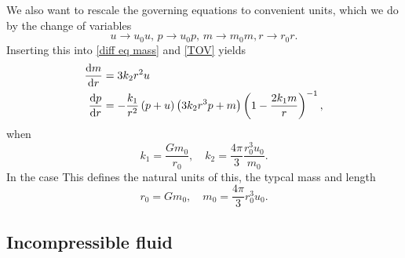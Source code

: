 We also want to rescale the governing equations to convenient units, which we do by the change of variables
%
\begin{equation}
    u \rightarrow u_0 u, \, p \rightarrow u_0 p, \, m \rightarrow m_0 m, r \rightarrow r_0 r.
\end{equation}
%
Inserting this into \autoref{diff eq mass} and \autoref{TOV} yields
%
\begin{align}
    \diff{m}{r} & = 3 k_2 r^2 u \\
    \diff{p}{r} & 
    = - \frac{k_1}{r^2} \left(p + u\right) \left(3 k_2 r^3 p + m\right) 
    \left(1 - \frac{2 k_1  m}{r}\right)^{-1},
\end{align}
%
when
%
\begin{equation}
    k_1 = \frac{G m_0}{r_0}, \quad k_2 =  \frac{4 \pi}{3} \frac{r_0^3 u_0}{m_0}.
\end{equation}
%
In the case 
This defines the natural units of this, the typcal mass and length
\begin{equation}
    \label{typical length}
    r_0 = G m_0, \quad m_0 = \frac{4 \pi}{3} r_0^3 u_0.
\end{equation}
%


\subsection*{Incompressible fluid}


